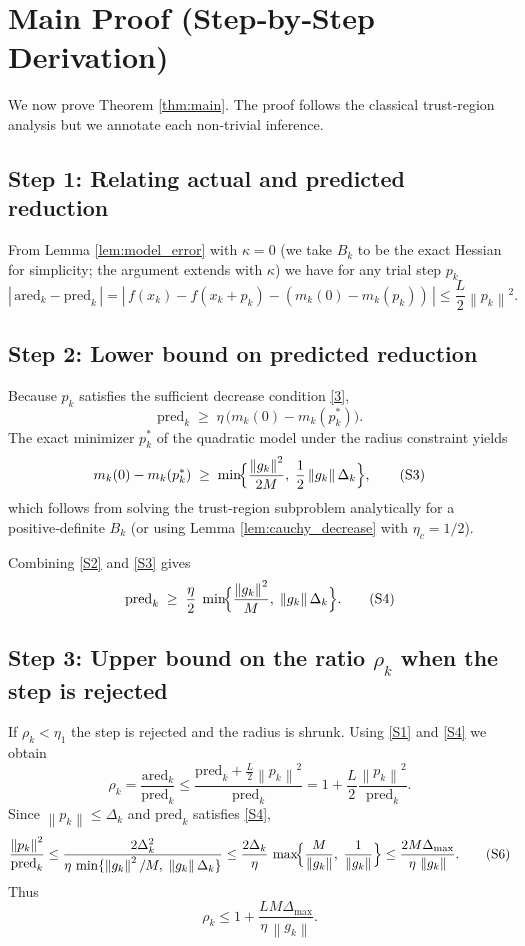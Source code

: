 \documentclass{article}
\newcommand{\norm}[1]{\left\lVert#1\right\rVert}
\begin{document}
\section*{Main Proof (Step‑by‑Step Derivation)}
We now prove Theorem \ref{thm:main}.  The proof follows the classical trust‑region analysis but we annotate each non‑trivial inference.

\subsection*{Step 1: Relating actual and predicted reduction}
From Lemma \ref{lem:model_error} with $\kappa=0$ (we take $B_{k}$ to be the exact Hessian for simplicity; the argument extends with $\kappa$) we have for any trial step $p_{k}$
\[
|\,\text{ared}_{k}-\text{pred}_{k}\,|
=|\,f(x_{k})-f(x_{k}+p_{k})-(m_{k}(0)-m_{k}(p_{k}))\,|
\le \frac{L}{2}\norm{p_{k}}^{2}.
\tag{S1}
\]
\subsection*{Step 2: Lower bound on predicted reduction}
Because $p_{k}$ satisfies the sufficient decrease condition \eqref{3},
\[
\text{pred}_{k}\;\ge\;\eta\,
\bigl(m_{k}(0)-m_{k}(p_{k}^{*})\bigr).
\tag{S2}
\]
The exact minimizer $p_{k}^{*}$ of the quadratic model under the radius constraint yields
\[
m_{k}(0)-m_{k}(p_{k}^{*})\;\ge\;
\min\!\Bigl\{ \frac{\norm{g_{k}}^{2}}{2M},\;
\frac12 \norm{g_{k}}\Delta_{k}\Bigr\},
\tag{S3}
\]
which follows from solving the trust‑region subproblem analytically for a positive‑definite $B_{k}$ (or using Lemma \ref{lem:cauchy_decrease} with $\eta_{c}=1/2$).  

Combining \eqref{S2} and \eqref{S3} gives
\[
\text{pred}_{k}\;\ge\;
\frac{\eta}{2}\;
\min\!\Bigl\{ \frac{\norm{g_{k}}^{2}}{M},\;
\norm{g_{k}}\Delta_{k}\Bigr\}.
\tag{S4}
\]

\subsection*{Step 3: Upper bound on the ratio $\rho_{k}$ when the step is rejected}
If $\rho_{k}<\eta_{1}$ the step is rejected and the radius is shrunk.  Using \eqref{S1} and \eqref{S4} we obtain
\[
\rho_{k}
= \frac{\text{ared}_{k}}{\text{pred}_{k}}
\le
\frac{\text{pred}_{k}+\frac{L}{2}\norm{p_{k}}^{2}}{\text{pred}_{k}}
=1+\frac{L}{2}\frac{\norm{p_{k}}^{2}}{\text{pred}_{k}}.
\tag{S5}
\]
Since $\norm{p_{k}}\le\Delta_{k}$ and $\text{pred}_{k}$ satisfies \eqref{S4},
\[
\frac{\norm{p_{k}}^{2}}{\text{pred}_{k}}
\le
\frac{2\Delta_{k}^{2}}{\eta\,
\min\{\norm{g_{k}}^{2}/M,\;\norm{g_{k}}\Delta_{k}\}}
\le
\frac{2\Delta_{k}}{\eta}\,
\max\!\Bigl\{\frac{M}{\norm{g_{k}}},\;\frac{1}{\norm{g_{k}}}\Bigr\}
\le
\frac{2M\Delta_{\max}}{\eta\,\norm{g_{k}}}.
\tag{S6}
\]
Thus
\[
\rho_{k}\le 1+\frac{LM\Delta_{\max}}{\eta\,\norm{g_{k}}}.
\tag{S7}
\]
\end{document}
